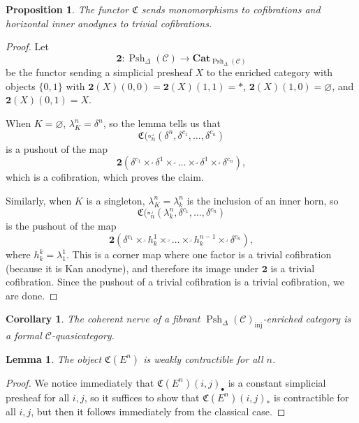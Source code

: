 \documentclass[a4paper]{article}
\numberwithin{equation}{subsection}
\theoremstyle{plain}   %
\newtheorem{prop}[equation]{Proposition}
\newtheorem{cor}[equation]{Corollary}
\newtheorem{lemma}[equation]{Lemma}
\theoremstyle{definition}
\theoremstyle{remark}
\theoremstyle{plain}
\newcommand{\Cat}{\ensuremath{\mathbf{Cat}}}
\providecommand{\C}{}
\renewcommand{\C}{\ensuremath{\mathcal{C}}}
\newcommand{\spsh}{\ensuremath{\operatorname{Psh}_\Delta(\mathcal{C})}}
\begin{document}
\begin{prop}\label{quillen1}
	The functor \(\mathfrak{C}\) sends monomorphisms to cofibrations and horizontal inner anodynes to trivial cofibrations.
\end{prop}
\begin{proof}
	Let \[\mathbf{2}:\spsh \to \Cat_{\spsh}\] be the functor sending a simplicial presheaf \(X\) to the enriched category with objects \(\{0,1\}\) with \(\mathbf{2}(X)(0,0)=\mathbf{2}(X)(1,1)=\ast\), \(\mathbf{2}(X)(1,0)=\varnothing\), and \(\mathbf{2}(X)(0,1)=X\).

	When \(K=\varnothing\), \(\lambda^n_K=\delta^n\), so the lemma tells us that \[\mathfrak{C}(\square^\lrcorner_n(\delta^n,\delta^{c_1},\dots,\delta^{c_n})\] is a pushout of the map \[\mathbf{2}(\delta^{c_1}\times^\lrcorner \delta^1 \times^\lrcorner \dots \times^\lrcorner \delta^1 \times^\lrcorner \delta^{c_n}),\] which is a cofibration, which proves the claim.

	Similarly, when \(K\) is a singleton, \(\lambda^n_K=\lambda^n_k\) is the inclusion of an inner horn, so \[\mathfrak{C}(\square^\lrcorner_n(\lambda^n_k,\delta^{c_1},\dots,\delta^{c_n})\] is the pushout of the map \[\mathbf{2}(\delta^{c_1}\times^\lrcorner h^1_k \times^\lrcorner \dots \times^\lrcorner h^{n-1}_k \times^\lrcorner \delta^{c_n}),\] where \(h^k_k=\lambda^1_1\).  This is a corner map where one factor is a trivial cofibration (because it is Kan anodyne), and therefore its image under \(\mathbf{2}\) is a trivial cofibration.  Since the pushout of a trivial cofibration is a trivial cofibration, we are done.
\end{proof}

\begin{cor}
	The coherent nerve of a fibrant \(\spsh_{\mathrm{inj}}\)-enriched category is a formal \(\C\)-quasicategory.
\end{cor}

\begin{lemma}
	The object \(\mathfrak{C}(E^n)\) is weakly contractible for all \(n\).
\end{lemma}
\begin{proof}
	We notice immediately that \(\mathfrak{C}(E^n)(i,j)_\bullet\) is a constant simplicial presheaf for all \(i,j\), so it suffices to show that \(\mathfrak{C}(E^n)(i,j)_\ast\) is contractible for all \(i,j\), but then it follows immediately from the classical case.
\end{proof}
\end{document}
